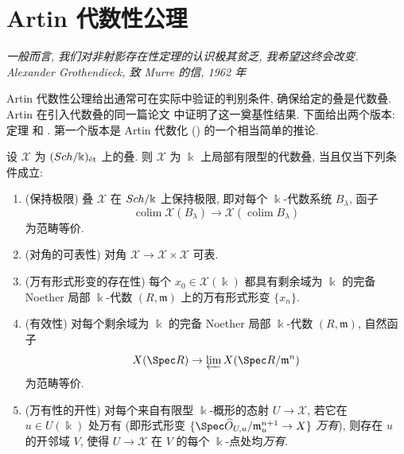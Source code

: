 \section{Artin 代数性公理}\label{src:C.7}
\begin{flushright}\itshape
一般而言, 我们对非射影存在性定理的认识极其贫乏, 我希望这终会改变.\\
\normalfont Alexander Grothendieck, 致 Murre 的信, 1962 年 \cite[第 $663$ 页]{Mum10}
\end{flushright}
Artin 代数性公理给出通常可在实际中验证的判别条件, 确保给定的叠是代数叠. Artin 在引入代数叠的同一篇论文 \cite{Art74b} 中证明了这一奠基性结果. 下面给出两个版本: 定理  和 . 第一个版本是 Artin 代数化 () 的一个相当简单的推论.
\begin{theorem}\label{src:C.7.1}
设 $\mathcal X$ 为 $(Sch/\Bbbk)_{\text{ét}}$ 上的叠. 则 $\mathcal X$ 为 $\Bbbk$ 上局部有限型的代数叠, 当且仅当下列条件成立:
\begin{enumerate}[(1)]
\item (保持极限) 叠 $\mathcal X$ 在 $Sch/\Bbbk$ 上保持极限, 即对每个 $\Bbbk$-代数系统 $B_\lambda$, 函子
\[
\operatorname{colim}\mathcal X(B_\lambda)\to\mathcal X(\operatorname{colim}B_\lambda)
\]
为范畴等价.
\item (对角的可表性) 对角 $\mathcal X\to\mathcal X\times\mathcal X$ 可表.
\item (万有形式形变的存在性) 每个 $x_0\in\mathcal X(\Bbbk)$ 都具有剩余域为 $\Bbbk$ 的完备 Noether 局部 $\Bbbk$-代数 $(R,\mathfrak m)$ 上的万有形式形变 $\{x_n\}$.
\item (有效性) 对每个剩余域为 $\Bbbk$ 的完备 Noether 局部 $\Bbbk$-代数 $(R,\mathfrak m)$, 自然函子
\[
\mathcal X(\Spec R)\to\varprojlim\mathcal X(\Spec R/\mathfrak m^n)
\]
为范畴等价.
\item (万有性的开性) 对每个来自有限型 $\Bbbk$-概形的态射 $U\to\mathcal X$, 若它在 $u\in U(\Bbbk)$ 处万有 (即形式形变 $\{\Spec\widehat{\mathcal O}_{U,u}/\mathfrak m_u^{n+1}\to\mathcal X\}$ \textit{万有}), 则存在 $u$ 的开邻域 $V$, 使得 $U\to\mathcal X$ 在 $V$ 的每个 $\Bbbk$-点处均\textit{万有}.
\end{enumerate}
\end{theorem}
